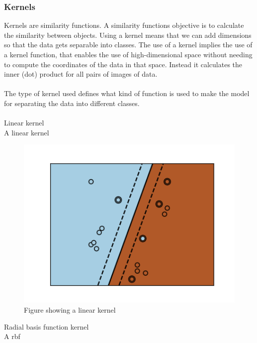 \documentclass[11pt]{article}
\begin{document}
\subsubsection{Kernels}
Kernels are similarity functions. A similarity functions objective is to calculate the similarity between objects. Using a kernel means that we can add dimensions so that the data gets separable into classes. The use of a kernel implies the use of a kernel function, that enables the use of high-dimensional space without needing to compute the coordinates of the data in that space. Instead it calculates the inner (dot) product for all pairs of images of data.\cite{KernelMethod2021}\\
\\
The type of kernel used defines what kind of function is used to make the model for separating the data into different classes.\cite{SVMKernelsScikitlearn24}\\
\\
\large{Linear kernel}\\
A linear kernel

\begin{figure}[ht]
  \centering
  \includegraphics[width=12cm]{graphics/kernel_linear.png}
  \caption{Figure showing a linear kernel}
\end{figure}

\large{Radial basis function kernel}\\
A \gls{rbf}
\end{document}
